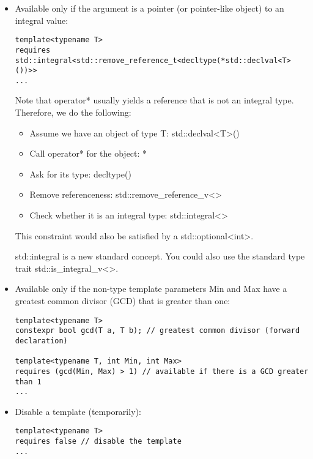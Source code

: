 \begin{itemize}
\item
Available only if the argument is a pointer (or pointer-like object) to an integral value:

\begin{lstlisting}[style=styleCXX]
template<typename T>
requires std::integral<std::remove_reference_t<decltype(*std::declval<T>())>>
...
\end{lstlisting}

Note that operator* usually yields a reference that is not an integral type. Therefore, we do the following:

\begin{itemize}
\item
Assume we have an object of type T: std::declval<T>()

\item
Call operator* for the object: *

\item
Ask for its type: decltype()

\item
Remove referenceness: std::remove\_reference\_v<>

\item
Check whether it is an integral type: std::integral<>
\end{itemize}

This constraint would also be satisfied by a std::optional<int>.

std::integral is a new standard concept. You could also use the standard type trait std::is\_integral\_v<>.

\item
Available only if the non-type template parameters Min and Max have a greatest common divisor (GCD) that is greater than one:

\begin{lstlisting}[style=styleCXX]
template<typename T>
constexpr bool gcd(T a, T b); // greatest common divisor (forward declaration)

template<typename T, int Min, int Max>
requires (gcd(Min, Max) > 1) // available if there is a GCD greater than 1
...
\end{lstlisting}

\item
Disable a template (temporarily):

\begin{lstlisting}[style=styleCXX]
template<typename T>
requires false // disable the template
...
\end{lstlisting}
\end{itemize}

